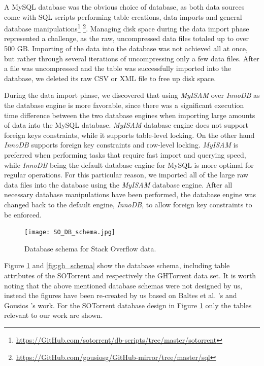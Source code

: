         A MySQL database was the obvious choice of database, as both data sources come with SQL scripts performing table creations, data imports and general database manipulations\footnote{\label{SO_sql} \url{https://GitHub.com/sotorrent/db-scripts/tree/master/sotorrent}} \footnote{\label{GH_sql} \url{https://GitHub.com/gousiosg/GitHub-mirror/tree/master/sql}}. Managing disk space during the data import phase represented a challenge, as the raw, uncompressed data files totaled up to over 500 GB. Importing of the data into the database was not achieved all at once, but rather through several iterations of uncompressing only a few data files. After a file was uncompressed and the table was successfully imported into the database, we deleted its raw CSV or XML file to free up disk space. 
        
        During the data import phase, we discovered that using \textit{MyISAM} over \textit{InnoDB} as the database engine is more favorable, since there was a significant execution time difference between the two database engines when importing large amounts of data into the MySQL database. \textit{MyISAM} database engine does not support foreign keys constraints, while it supports table-level locking. On the other hand \textit{InnoDB} supports foreign key constraints and row-level locking. \textit{MyISAM} is preferred when performing tasks that require fast import and querying speed, while \textit{InnoDB} being the default database engine for MySQL is more optimal for regular operations. For this particular reason, we imported all of the large raw data files into the database using the \textit{MyISAM} database engine. After all necessary database manipulations have been performed, the database engine was changed back to the default engine, \textit{InnoDB}, to allow foreign key constraints to be enforced. 
      
        \begin{figure}[!ht]
          \centering
          \texttt{[image: SO\_DB\_schema.jpg]}\\
          \caption{Database schema for Stack Overflow data.}
          \label{fig:so_schema}
        \end{figure}
        
        Figure \ref{fig:so_schema} and \ref{fig:gh_schema} show the database schema, including table attributes of the SOTorrent and respectively the GHTorrent data set. It is worth noting that the above mentioned database schemas were not designed by us, instead the figures have been re-created by us based on Baltes et al. \cite{baltes2018sotorrent}'s and Gousios \cite{gousios2013ghtorent}'s work. For the SOTorrent database design in Figure \ref{fig:so_schema} only the tables relevant to our work are shown. 
 
